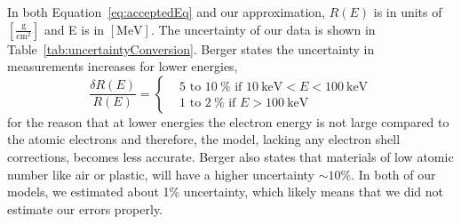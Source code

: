 In both Equation~\eqref{eq:acceptedEq} and our approximation, $R(E)$ is in units of $[\frac{\text{g}}{\text{cm}^2}]$ and E is in $[\text{MeV}]$. The uncertainty of our data is shown in Table~\ref{tab:uncertaintyConversion}. Berger states the uncertainty in measurements increases for lower energies, 
\begin{equation}
	\frac{\delta R(E)}{R(E)} = 
	\begin{cases}
		& 5 \text{~to~} 10~\% \text{ if } 10~\text{keV}<E<100~\text{keV} \\
		& 1 \text{~to~} 2~\% \text{ if } E>100~\text{keV} 
	\end{cases}
\end{equation}
for the reason that at lower energies the electron energy is not large compared to the atomic electrons and therefore, the model, lacking any electron shell corrections, becomes less accurate. Berger also states that materials of low atomic number like air or plastic, will have a higher uncertainty $\sim 10\%$. In both of our models, we estimated about 1\% uncertainty, which likely means that we did not estimate our errors properly.


